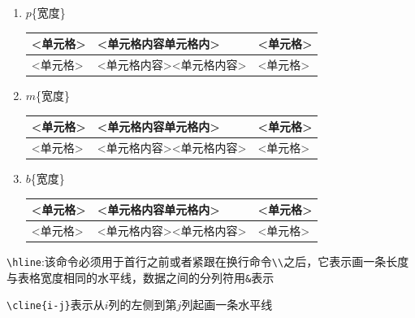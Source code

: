 \documentclass[cn,chinese,color=cyan]{elegantbook}
\begin{document}
\begin{enumerate}
	\item $p$\{宽度\}
	\vskip 2mm 
	\begin{tabular}{|p{3cm}|p{3cm}|p{5cm}|} \hline
		<单元格> & <单元格内容单元格内>& <单元格> \\ \hline
		<单元格> & <单元格内容><单元格内容> & <单元格> \\ \hline
	\end{tabular}
	\vskip 2mm 	
	\item $m$\{宽度\}
	\vskip 2mm 
	\begin{tabular}{|m{3cm}|m{3cm}|m{5cm}|}  \hline
		<单元格> & <单元格内容单元格内>& <单元格> \\ \hline
		<单元格> & <单元格内容><单元格内容> & <单元格> \\ \hline
	\end{tabular}
	\vskip 2mm 
	\item $b$\{宽度\}
	\vskip 2mm 
	\begin{tabular}{|b{3cm}|b{3cm}|b{5cm}|}  \hline
		<单元格> & <单元格内容单元格内>& <单元格> \\ \hline
		<单元格> & <单元格内容><单元格内容> & <单元格> \\ \hline
	\end{tabular}
\end{enumerate}
\begin{note}
	\verb|\hline|:该命令必须用于首行之前或者紧跟在换行命令\verb|\\|之后，它表示画一条长度与表格宽度相同的水平线，数据之间的分列符用\verb|&|表示
	
	\verb|\cline{i-j}|表示从$i$列的左侧到第$j$列起画一条水平线
\end{note}
\end{document}
